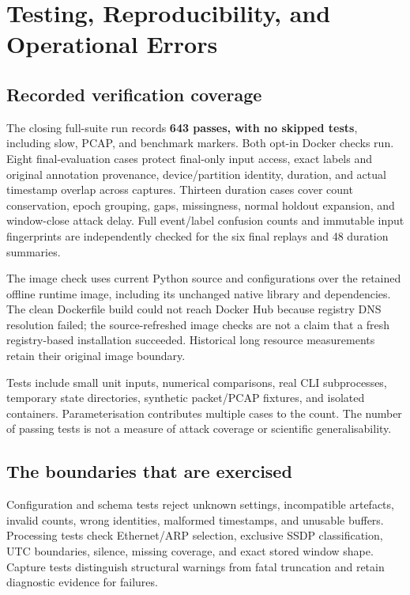 \section{Testing, Reproducibility, and Operational Errors}

\subsection{Recorded verification coverage}

The closing full-suite run records \textbf{643 passes, with no skipped tests},
including slow, PCAP, and benchmark markers. Both opt-in Docker checks run. Eight
final-evaluation cases protect final-only input access, exact labels and original
annotation provenance, device/partition identity, duration, and actual timestamp
overlap across captures. Thirteen duration cases cover count conservation,
epoch grouping, gaps, missingness, normal holdout expansion, and window-close
attack delay. Full event/label confusion counts and immutable input fingerprints
are independently checked for the six final replays and 48 duration summaries.

The image check uses current Python source and configurations over the retained
offline runtime image, including its unchanged native library and dependencies.
The clean Dockerfile build could not reach Docker Hub because registry DNS
resolution failed; the source-refreshed image checks are not a claim that a fresh
registry-based installation succeeded. Historical long resource measurements
retain their original image boundary.

Tests include small unit inputs, numerical comparisons, real CLI subprocesses,
temporary state directories, synthetic packet/PCAP fixtures, and isolated
containers. Parameterisation contributes multiple cases to the count.
The number of passing tests is not a measure of attack coverage or scientific
generalisability.

\subsection{The boundaries that are exercised}

Configuration and schema tests reject unknown settings, incompatible artefacts,
invalid counts, wrong identities, malformed timestamps, and unusable buffers.
Processing tests check Ethernet/ARP selection, exclusive SSDP classification,
UTC boundaries, silence, missing coverage, and exact stored window shape.
Capture tests distinguish structural warnings from fatal truncation and retain
diagnostic evidence for failures.

